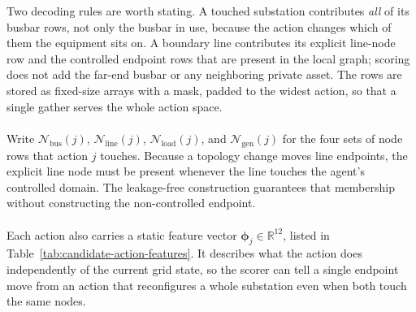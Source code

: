 \noindent Two decoding rules are worth stating. A touched substation contributes
\emph{all} of its busbar rows, not only the busbar in use, because the action
changes which of them the equipment sits on. A boundary line contributes its
explicit line-node row and the controlled endpoint rows that are present in the
local graph; scoring does not add the far-end busbar or any neighboring private
asset. The rows are stored as fixed-size arrays with a mask, padded to the
widest action, so that a single gather serves the whole action space.
\\
\\
Write $\mathcal{N}_{\mathrm{bus}}(j)$, $\mathcal{N}_{\mathrm{line}}(j)$,
$\mathcal{N}_{\mathrm{load}}(j)$, and $\mathcal{N}_{\mathrm{gen}}(j)$ for the
four sets of node rows that action $j$ touches. Because a topology change moves
line endpoints, the explicit line node must be present whenever the line
touches the agent's controlled domain. The leakage-free construction guarantees
that membership without constructing the non-controlled endpoint.
\\
\\
Each action also carries a static feature vector
$\boldsymbol{\phi}_j\in\mathbb{R}^{12}$, listed in
Table~\ref{tab:candidate-action-features}. It describes what the action does
independently of the current grid state, so the scorer can tell a single
endpoint move from an action that reconfigures a whole substation even when
both touch the same nodes.

